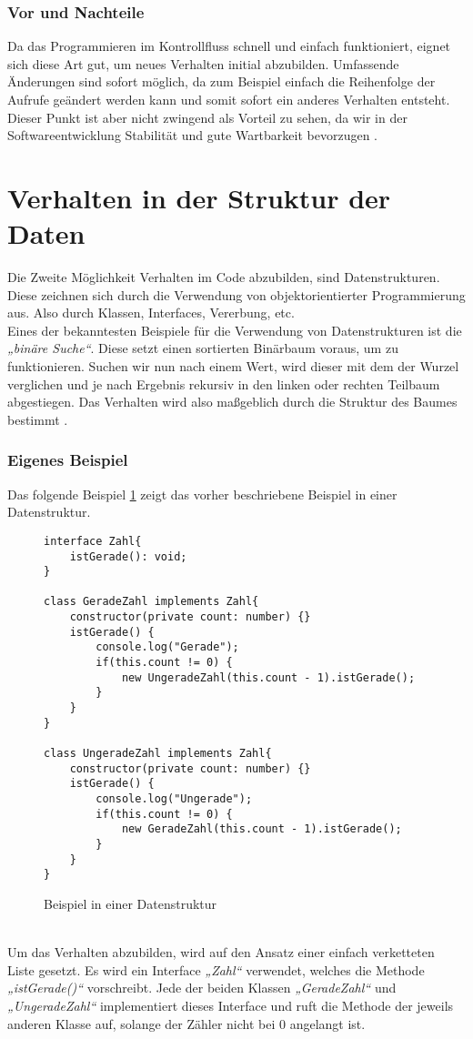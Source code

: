 \subsubsection{Vor und Nachteile}
Da das Programmieren im Kontrollfluss schnell und einfach funktioniert, eignet sich diese Art gut, um neues Verhalten initial abzubilden.
Umfassende Änderungen sind sofort möglich, da zum Beispiel einfach die Reihenfolge der Aufrufe geändert werden kann und somit sofort ein anderes Verhalten entsteht.
Dieser Punkt ist aber nicht zwingend als Vorteil zu sehen, da wir in der Softwareentwicklung Stabilität und gute Wartbarkeit bevorzugen \citep[S. 313 f.]{fiveLines.2023}. 

\section{Verhalten in der Struktur der Daten}
Die Zweite Möglichkeit Verhalten im Code abzubilden, sind Datenstrukturen.
Diese zeichnen sich durch die Verwendung von objektorientierter Programmierung aus.
Also durch Klassen, Interfaces, Vererbung, etc. \citep[S. 315 f.]{fiveLines.2023}\\
Eines der bekanntesten Beispiele für die Verwendung von Datenstrukturen ist die \textit{„binäre Suche“}.
Diese setzt einen sortierten Binärbaum voraus, um zu funktionieren.
Suchen wir nun nach einem Wert, wird dieser mit dem der Wurzel verglichen und je nach Ergebnis rekursiv in den linken oder rechten Teilbaum abgestiegen.
Das Verhalten wird also maßgeblich durch die Struktur des Baumes bestimmt \citep[S. 315 f.]{fiveLines.2023}.

\subsubsection{Eigenes Beispiel}
Das folgende Beispiel \ref{fig:DatenstrukturIstGerade} zeigt das vorher beschriebene Beispiel in einer Datenstruktur.
\begin{figure}[ht]
    \centering
        \begin{verbatim}
interface Zahl{
    istGerade(): void;
}

class GeradeZahl implements Zahl{
    constructor(private count: number) {}
    istGerade() {
        console.log("Gerade");
        if(this.count != 0) {
            new UngeradeZahl(this.count - 1).istGerade();
        }
    }
}

class UngeradeZahl implements Zahl{
    constructor(private count: number) {}
    istGerade() {
        console.log("Ungerade");
        if(this.count != 0) {
            new GeradeZahl(this.count - 1).istGerade();
        }
    }
}
        \end{verbatim}
    \caption{Beispiel in einer Datenstruktur}
    \label{fig:DatenstrukturIstGerade}
\end{figure}\\
Um das Verhalten abzubilden, wird auf den Ansatz einer einfach verketteten Liste gesetzt.
Es wird ein Interface \textit{„Zahl“} verwendet, welches die Methode \textit{„istGerade()“} vorschreibt.
Jede der beiden Klassen \textit{„GeradeZahl“} und \textit{„UngeradeZahl“} implementiert dieses Interface und ruft die Methode der jeweils anderen Klasse auf, solange der Zähler nicht bei 0 angelangt ist.
